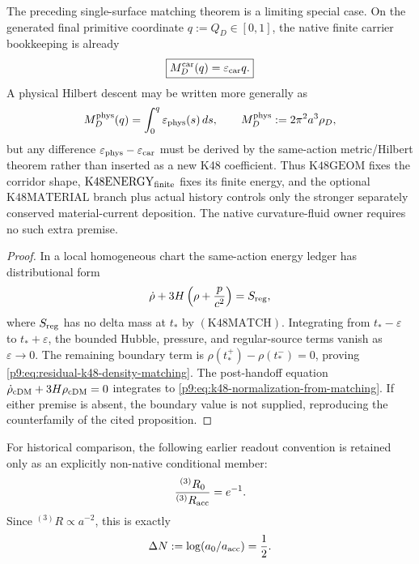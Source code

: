 \documentclass[12pt,a4paper]{article}
\begin{document}
\begin{remark}
The preceding single-surface matching theorem is a limiting special case.
On the generated final primitive coordinate \(q:=Q_D\in[0,1]\), the native
finite carrier bookkeeping is already
\[
 \boxed{M_D^{\rm car}(q)=\varepsilon_{\rm car}q.}
\]
A physical Hilbert descent may be written more generally as
\[
 M_D^{\rm phys}(q)=\int_0^q\varepsilon_{\rm phys}(s)\,ds,
 \qquad M_D^{\rm phys}:=2\pi^2a^3\rho_D,
\]
but any difference \(\varepsilon_{\rm phys}-\varepsilon_{\rm car}\) must be
derived by the same-action metric/Hilbert theorem rather than inserted as a
new K48 coefficient.  Thus \(\mathrm{K48GEOM}\) fixes the corridor shape,
\(\mathrm{K48ENERGY}_{\rm finite}\) fixes its finite energy, and
the optional \(\mathrm{K48MATERIAL}\) branch plus actual history controls
only the stronger separately conserved material-current deposition.  The native
curvature-fluid owner requires no such extra premise.
\end{remark}

\begin{proof}
In a local homogeneous chart the same-action energy ledger has distributional
form
\[
 \dot\rho+3H\left(\rho+\frac{p}{c^2}\right)=S_{\rm reg},
\]
where \(S_{\rm reg}\) has no delta mass at \(t_*\) by
\((\mathrm{K48MATCH})\).  Integrating from \(t_*-\varepsilon\) to
\(t_*+\varepsilon\), the bounded Hubble, pressure, and regular-source terms
vanish as \(\varepsilon\to0\).  The remaining boundary term is
\(\rho(t_*^+)-\rho(t_*^-)=0\), proving
\eqref{p9:eq:residual-k48-density-matching}.  The post-handoff equation
\(\dot\rho_{\rm cDM}+3H\rho_{\rm cDM}=0\) integrates to
\eqref{p9:eq:k48-normalization-from-matching}.  If either premise is absent,
the boundary value is not supplied, reproducing the counterfamily of the
cited proposition.
\end{proof}

For historical comparison, the following earlier readout convention is retained only as an explicitly non-native conditional member:
\begin{equation}
\label{p9:eq:present-curvature-tick-selector}
\frac{{}^{(3)}R_0}{{}^{(3)}R_{\rm acc}}=e^{-1}.
\end{equation}
Since \({}^{(3)}R\propto a^{-2}\), this is exactly
\begin{equation}
\label{p9:eq:present-deltaN-half}
\Delta N:=\log(a_0/a_{\rm acc})=\frac12.
\end{equation}
\end{document}
